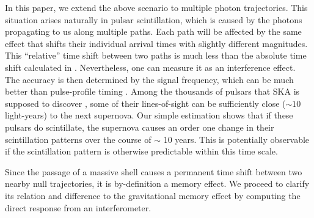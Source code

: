 \documentclass[aps,showpacs,onecolumn,floats,prd,superscriptaddress,nofootinbib]{revtex4-1}
\begin{document}
In this paper, we extend the above scenario to multiple photon trajectories.
This situation arises naturally in pulsar scintillation, which is caused by the photons propagating to us along multiple paths. 
Each path will be affected by the same effect that shifts their individual arrival times with slightly different magnitudes.
This ``relative'' time shift between two paths is much less than the absolute time shift calculated in \cite{Olum:2013gza, PhysRevD.93.103006}. 
Nevertheless, one can measure it as an interference effect.
The accuracy is then determined by the signal frequency, which can be much better than pulse-profile timing \cite{PenYan14}.
Among the thousands of pulsars that SKA is supposed to discover \cite{MSPpopulation}, some of their lines-of-sight can be sufficiently close ($\sim 10$ light-years) to the next supernova.
Our simple estimation shows that if these pulsars do scintillate, the supernova causes an order one change in their scintillation patterns over the course of $\sim$ 10 years. 
This is potentially observable if the scintillation pattern is otherwise predictable within this time scale.

Since the passage of a massive shell causes a permanent time shift between two nearby null trajectories, it is by-definition a memory effect.
We proceed to clarify its relation and difference to the gravitational memory effect \cite{Christodoulou_effect,GW_memory} by computing the direct response from an interferometer.

\end{document}
